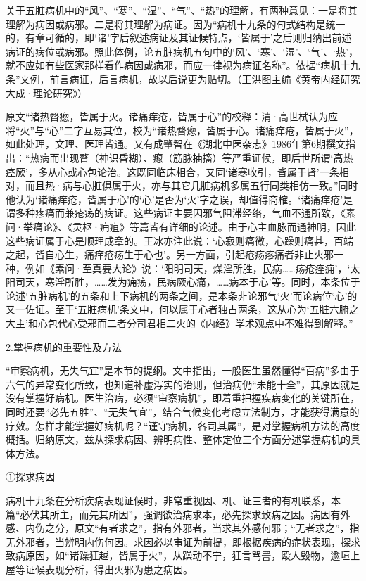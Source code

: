 \documentclass[draft,12pt]{ctexbook}
\begin{document}
关于五脏病机中的“风”、“寒”、“湿”、“气”、“热”的理解，有两种意见：一是将其理解为病因或病邪。二是将其理解为病证。因为“病机十九条的句式结构是统一的，有章可循的，即‘诸’字后叙述病证及其证候特点，‘皆属于’之后则归纳出前述病证的病位或病邪。照此体例，论五脏病机五句中的‘风’、‘寒’、‘湿’、‘气'、‘热’，就不应如有些医家那样看作病因或病邪，而应一律视为病证名称”。依据“病机十九条”文例，前言病证，后言病机，故以后说更为贴切。（王洪图主编《黄帝内经研究大成·理论研究》）

原文“诸热瞀瘛，皆属于火。诸痛痒疮，皆属于心”的校释：清·高世栻认为应将“火”与“心”二字互易其位，校为“诸热瞀瘛，皆属于心。诸痛痒疮，皆属于火”，如此处理，文理、医理皆通。又有成肇智在《湖北中医杂志》1986年第6期撰文指出：“热病而出现瞀（神识昏糊）、瘛（筋脉抽搐）等严重证候，即后世所谓‘高热痉厥’，多从心或心包论治。这既同临床相合，又同‘诸寒收引，皆属于肾’一条相对，而且热·病与心脏俱属于火，亦与其它几脏病机多属五行同类相仿一致。”同时他认为‘诸痛痒疮，皆属于心’的‘心’是否为‘火’字之误，却值得商榷。‘诸痛痒疮’是谓多种疼痛而兼疮疡的病证。这些病证主要因邪气阻滞经络，气血不通所致，《素问·举痛论》、《灵枢·痈疽》等篇皆有详细的论述。由于心主血脉而通神明，因此这些病证属于心是顺理成章的。王冰亦注此说：‘心寂则痛微，心躁则痛甚，百端之起，皆自心生，痛痒疮疡生于心也’。另一方面，引起疮疡疼痛者非止火邪一种，例如《素问·至真要大论》说：‘阳明司天，燥淫所胜，民病……疡疮痤痈’，‘太阳司天，寒淫所胜，……发为痈疡，民病厥心痛，……病本于心’等。同时，本条位于论述‘五脏病机’的五条和上下病机的两条之间，是本条非论邪气‘火’而论病位‘心’的又一佐证。至于‘五脏病机’条文中，何以属于心者独占两条，这从心为‘五脏六腑之大主’和心包代心受邪而二者分司君相二火的《内经》学术观点中不难得到解释。”

2.掌握病机的重要性及方法

“审察病机，无失气宜”是本节的提纲。文中指出，一般医生虽然懂得“百病”多由于六气的异常变化所致，也知道补虚泻实的治则，但治病仍“未能十全”，其原因就是没有掌握好病机。医生治病，必须“审察病机”，即着重把握疾病变化的关键所在，同时还要“必先五胜”、“无失气宜”，结合气候变化考虑立法制方，才能获得满意的疗效。怎样才能掌握好病机呢？“谨守病机，各司其属”，是对掌握病机方法的高度概括。归纳原文，兹从探求病因、辨明病性、整体定位三个方面分述掌握病机的具体方法。

①探求病因

病机十九条在分析疾病表现证候时，非常重视因、机、证三者的有机联系，本篇“必伏其所主，而先其所因”，强调欲治病求本，必先探求致病之因。病因有外感、内伤之分，原文“有者求之”，指有外邪者，当求其外感何邪；“无者求之”，指无外邪者，当辨明内伤何因。求因必以审证为前提，即根据疾病的症状表现，探求致病原因，如“诸躁狂越，皆属于火”，从躁动不宁，狂言骂詈，殴人毁物，逾垣上屋等证候表现分析，得出火邪为患之病因。
\end{document}
